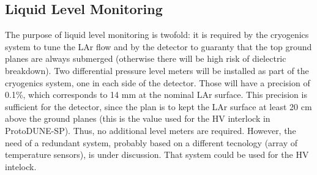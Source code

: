 \subsection{Liquid Level Monitoring}
\label{sec:fdsp-slow-cryo-liq-lev}

The purpose of liquid level monitoring is twofold: it is required by the cryogenics system to tune the LAr flow and by the detector
to guaranty that the top ground planes are always submerged (otherwise there will be high risk of dielectric breakdown).  
Two differential pressure level meters will be installed as part of the cryogenics system, one in each side of the detector.
Those will have a precision of 0.1\%, which corresponds to 14 mm at the nominal LAr surface.
This precision is sufficient for the detector, since the plan is to kept the LAr surface at
least 20 cm above the ground planes (this is the value used for the HV interlock in
ProtoDUNE-SP). Thus, no additional level meters are required. However, the need of a redundant system, probably based on a different tecnology
(array of temperature sensors), is under discussion. That system could be used for the HV intelock. 


 
